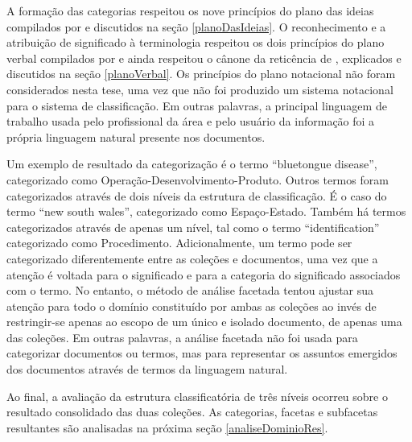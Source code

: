 A formação das categorias respeitou os nove princípios do plano das ideias compilados por  e discutidos na seção \ref{planoDasIdeias}. O reconhecimento e a atribuição de significado à terminologia respeitou os dois princípios do plano verbal compilados por  e ainda respeitou o cânone da reticência de , explicados e discutidos na seção \ref{planoVerbal}. Os princípios do plano notacional não foram considerados nesta tese, uma vez que não foi produzido um sistema notacional para o sistema de classificação. Em outras palavras, a principal linguagem de trabalho usada pelo profissional da área e pelo usuário da informação foi a própria linguagem natural presente nos documentos.

Um exemplo de resultado da categorização é o termo ``bluetongue disease'', categorizado como Operação-Desenvolvimento-Produto. Outros termos foram categorizados através de dois níveis da estrutura de classificação. É o caso do termo ``new south wales'', categorizado como Espaço-Estado. Também há termos categorizados através de apenas um nível, tal como o termo ``identification'' categorizado como Procedimento. Adicionalmente, um termo pode ser categorizado diferentemente entre as coleções e documentos, uma vez que a atenção é voltada para o significado e para a categoria do significado associados com o termo. No entanto, o método de análise facetada tentou ajustar sua atenção para todo o domínio constituído por ambas as coleções ao invés de restringir-se apenas ao escopo de um único e isolado documento, de apenas uma das coleções. Em outras palavras, a análise facetada não foi usada para categorizar documentos ou termos, mas para representar os assuntos emergidos dos documentos através de termos da linguagem natural.

Ao final, a avaliação da estrutura classificatória de três níveis ocorreu sobre o resultado consolidado das duas coleções. As categorias, facetas e subfacetas resultantes são analisadas na próxima seção \ref{analiseDominioRes}.


